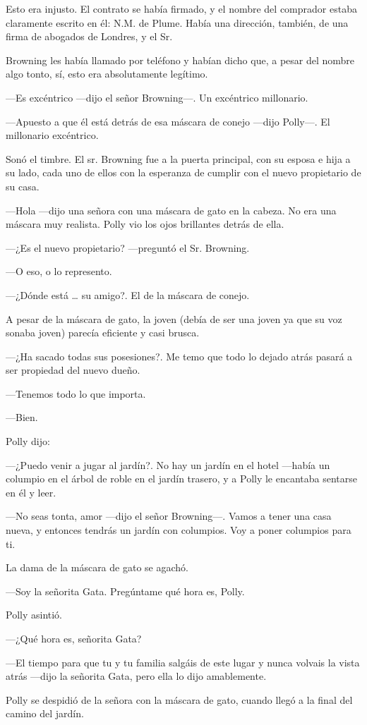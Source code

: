 Esto era injusto. El contrato se había firmado, y el nombre del comprador estaba claramente escrito en él: N.M. de Plume. Había una dirección, también, de una firma de abogados de Londres, y el Sr.

Browning les había llamado por teléfono y habían dicho que, a pesar del nombre algo tonto, sí, esto era absolutamente legítimo.

---Es excéntrico ---dijo el señor Browning---. Un excéntrico millonario.

---Apuesto a que él está detrás de esa máscara de conejo ---dijo Polly---. El millonario excéntrico.

Sonó el timbre. El sr. Browning fue a la puerta principal, con su esposa e hija a su lado, cada uno de ellos con la esperanza de cumplir con el nuevo propietario de su casa.

---Hola ---dijo una señora con una máscara de gato en la cabeza. No era una máscara muy realista. Polly vio los ojos brillantes detrás de ella.

---¿Es el nuevo propietario? ---preguntó el Sr. Browning.

---O eso, o lo represento.

---¿Dónde está \ldots{} su amigo?. El de la máscara de conejo.

A pesar de la máscara de gato, la joven (debía de ser una joven ya que su voz sonaba joven) parecía eficiente y casi brusca.

---¿Ha sacado todas sus posesiones?. Me temo que todo lo dejado atrás pasará a ser propiedad del nuevo dueño.

---Tenemos todo lo que importa.

---Bien.

Polly dijo:

---¿Puedo venir a jugar al jardín?. No hay un jardín en el hotel ---había un columpio en el árbol de roble en el jardín trasero, y a Polly le encantaba sentarse en él y leer.

---No seas tonta, amor ---dijo el señor Browning---. Vamos a tener una casa nueva, y entonces tendrás un jardín con columpios. Voy a poner columpios para ti.

La dama de la máscara de gato se agachó.

---Soy la señorita Gata. Pregúntame qué hora es, Polly.

Polly asintió.

---¿Qué hora es, señorita Gata?

---El tiempo para que tu y tu familia salgáis de este lugar y nunca volvais la vista atrás ---dijo la señorita Gata, pero ella lo dijo amablemente.

Polly se despidió de la señora con la máscara de gato, cuando llegó a la final del camino del jardín.